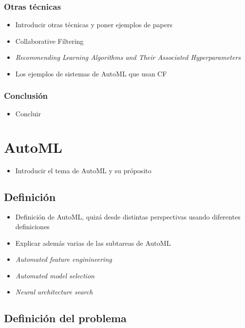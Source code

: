 \subsubsection{Otras técnicas}

\begin{itemize}
	\item Introducir otras técnicas y poner ejemplos de papers
	\item Collaborative Filtering
	\item \textit{Recommending Learning Algorithms and Their Associated Hyperparameters}
	\item Los ejemplos de sistemas de AutoML que usan CF
\end{itemize}

\subsubsection{Conclusión} 

\begin{itemize}
	\item Concluir
\end{itemize}

\section{AutoML}

\begin{itemize}
	\item Introducir el tema de AutoML y su próposito
\end{itemize}

\subsection{Definición} 


\begin{itemize}
	\item Definición de AutoML, quizá desde distintas perspectivas usando diferentes definiciones
	\item Explicar además varias de las subtareas de AutoML
	\item \textit{Automated feature enginineering}
	\item \textit{Automated model selection}
	\item \textit{Neural architecture search}
\end{itemize}

\subsection{Definición del problema} 


